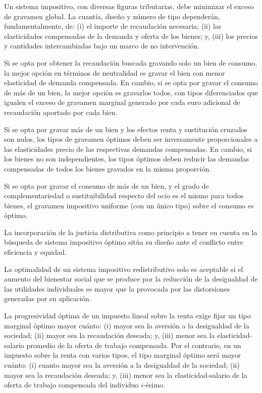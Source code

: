 \documentclass[10pt,a4paper]{article}
\newcommand{\puntosclave}[1]{%
  \begin{tcolorbox}[
    colframe=black,
    title={Puntos clave},
    before upper={\setlength{\parindent}{0.5cm}\setlength{\parskip}{0.5\baselineskip}}
  ]
  #1
  \end{tcolorbox}
}
\begin{document}
\puntosclave{
    Un sistema impositivo, con diversas figuras tributarias, debe minimizar el exceso de gravamen global. La cuantía, diseño y número de tipo dependerán, fundamentalmente, de: (i) el importe de recaudación necesaria; (ii) las elasticidades compensadas de la demanda y oferta de los bienes; y, (iii) los precios y cantidades intercambiadas bajo un marco de no intervención.

    Si se opta por obtener la recaudación buscada gravando solo un bien de consumo, la mejor opción en términos de neutralidad es gravar el bien con menor elasticidad de demanda compensada. En cambio, si se opta por gravar el consumo de más de un bien, la mejor opción es gravarlos todos, con tipos diferenciados que igualen el exceso de gravamen marginal generado por cada euro adicional de recaudación aportado por cada bien.
    
    Si se opta por gravar más de un bien y los efectos renta y sustitución cruzados son nulos, los tipos de gravamen óptimos deben ser inversamente proporcionales a las elasticidades precio de las respectivas demandas compensadas. En cambio, si los bienes no son independientes, los tipos óptimos deben reducir las demandas compensadas de todos los bienes gravados en la misma proporción.

    Si se opta por gravar el consumo de más de un bien, y el grado de complementariedad o sustituibilidad respecto del ocio es el mismo para todos bienes, el gravamen impositivo uniforme (con un único tipo) sobre el consumo es óptimo.

    La incorporación de la justicia distributiva como principio a tener en cuenta en la búsqueda de sistema impositivo óptimo sitúa su diseño ante el conflicto entre eficiencia y equidad. 

    La optimalidad de un sistema impositivo redistributivo solo es aceptable si el aumento del bienestar social que se produce por la reducción de la desigualdad de las utilidades individuales es mayor que la provocada por las distorsiones generadas por su aplicación.
    
    La progresividad óptima de un impuesto lineal sobre la renta exige fijar un tipo marginal óptimo mayor cuánto: (i) mayor sea la aversión a la desigualdad de la sociedad; (ii) mayor sea la recaudación deseada; y, (iii) menor sea la elasticidad-salario promedio de la oferta de trabajo compensada. Por el contrario, en un impuesto sobre la renta con varios tipos, el tipo marginal óptimo será mayor cuánto: (i) cuanto mayor sea la aversión a la desigualdad de la sociedad; (ii) mayor sea la recaudación deseada; y, (iii) menor sea la elasticidad-salario de la oferta de trabajo compensada del individuo $i$-ésimo.
    
}
\end{document}

